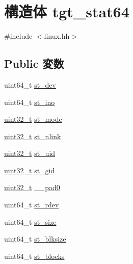 \hypertarget{structArmLinux64_1_1tgt__stat64}{
\section{構造体 tgt\_\-stat64}
\label{structArmLinux64_1_1tgt__stat64}
}


{\ttfamily \#include $<$linux.hh$>$}\subsection*{Public 変数}
\begin{DoxyCompactItemize}
\item 
uint64\_\-t \hyperlink{structArmLinux64_1_1tgt__stat64_a0146849d3da5c91d9776888b14b82dcc}{st\_\-dev}
\item 
uint64\_\-t \hyperlink{structArmLinux64_1_1tgt__stat64_abb54f0e7d91659ba9f4ab77a5392c08a}{st\_\-ino}
\item 
\hyperlink{Type_8hh_a435d1572bf3f880d55459d9805097f62}{uint32\_\-t} \hyperlink{structArmLinux64_1_1tgt__stat64_a75f55d064ed3b380b0315de36e178885}{st\_\-mode}
\item 
\hyperlink{Type_8hh_a435d1572bf3f880d55459d9805097f62}{uint32\_\-t} \hyperlink{structArmLinux64_1_1tgt__stat64_ab77c257c135fa586e930ef0bf0977c08}{st\_\-nlink}
\item 
\hyperlink{Type_8hh_a435d1572bf3f880d55459d9805097f62}{uint32\_\-t} \hyperlink{structArmLinux64_1_1tgt__stat64_ad5477a292a4edf27aa5766e01e0f5d1f}{st\_\-uid}
\item 
\hyperlink{Type_8hh_a435d1572bf3f880d55459d9805097f62}{uint32\_\-t} \hyperlink{structArmLinux64_1_1tgt__stat64_a1faa6012541b83fd5218e2b229f876ec}{st\_\-gid}
\item 
\hyperlink{Type_8hh_a435d1572bf3f880d55459d9805097f62}{uint32\_\-t} \hyperlink{structArmLinux64_1_1tgt__stat64_a8a67e7e5a583fb9e94edf6f27d30cb09}{\_\-\_\-pad0}
\item 
uint64\_\-t \hyperlink{structArmLinux64_1_1tgt__stat64_ac430407fd3b0e421da1ee8f66c95a786}{st\_\-rdev}
\item 
uint64\_\-t \hyperlink{structArmLinux64_1_1tgt__stat64_ae9a97f03571901a066d512b87bc36dba}{st\_\-size}
\item 
uint64\_\-t \hyperlink{structArmLinux64_1_1tgt__stat64_adb9252bb3343471e4aaaf7bf7df5363a}{st\_\-blksize}
\item 
uint64\_\-t \hyperlink{structArmLinux64_1_1tgt__stat64_a72c24b54949be7eaac849d71fc056a3c}{st\_\-blocks}
\item 

\end{DoxyCompactItemize}
